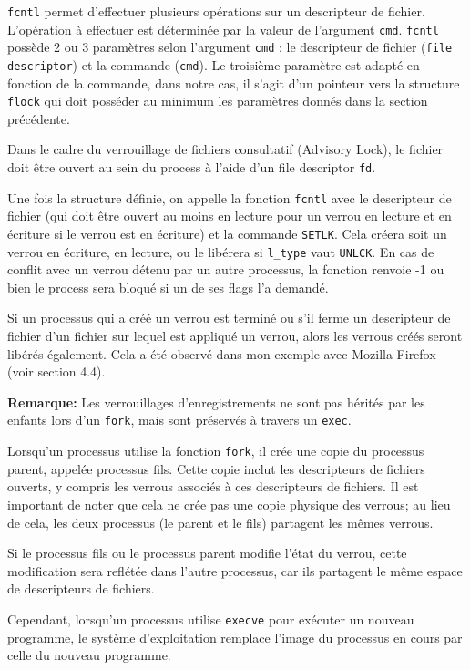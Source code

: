\texttt{fcntl} permet d'effectuer plusieurs opérations sur un descripteur de fichier. L'opération à effectuer est déterminée par la valeur de l'argument \texttt{cmd}. \texttt{fcntl} possède 2 ou 3 paramètres selon l'argument \texttt{cmd} : le descripteur de fichier (\texttt{file descriptor}) et la commande (\texttt{cmd}). Le troisième paramètre est adapté en fonction de la commande, dans notre cas, il s'agit d'un pointeur vers la structure \texttt{flock} qui doit posséder au minimum les paramètres donnés dans la section précédente.
    
Dans le cadre du verrouillage de fichiers consultatif (Advisory Lock), le fichier doit être ouvert au sein du process à l'aide d'un file descriptor \texttt{fd}.

Une fois la structure définie, on appelle la fonction \texttt{fcntl} avec le descripteur de fichier (qui doit être ouvert au moins en lecture pour un verrou en lecture et en écriture si le verrou est en écriture) et la commande \texttt{SETLK}. Cela créera soit un verrou en écriture, en lecture, ou le libérera si \texttt{l\_type} vaut \texttt{UNLCK}. En cas de conflit avec un verrou détenu par un autre processus, la fonction renvoie -1 ou bien le process sera bloqué si un de ses flags l'a demandé.

Si un processus qui a créé un verrou est terminé ou s'il ferme un descripteur de fichier d'un fichier sur lequel est appliqué un verrou, alors les verrous créés seront libérés également. Cela a été observé dans mon exemple avec Mozilla Firefox (voir section 4.4).
\newline

\textbf{Remarque:} 
Les verrouillages d'enregistrements ne sont pas hérités par les enfants lors d'un \texttt{fork}, mais sont préservés à travers un \texttt{exec}.

Lorsqu'un processus utilise la fonction \texttt{fork}, il crée une copie du processus parent, appelée processus fils. Cette copie inclut les descripteurs de fichiers ouverts, y compris les verrous associés à ces descripteurs de fichiers. Il est important de noter que cela ne crée pas une copie physique des verrous; au lieu de cela, les deux processus (le parent et le fils) partagent les mêmes verrous.

Si le processus fils ou le processus parent modifie l'état du verrou, cette modification sera reflétée dans l'autre processus, car ils partagent le même espace de descripteurs de fichiers.

Cependant, lorsqu'un processus utilise \texttt{execve} pour exécuter un nouveau programme, le système d'exploitation remplace l'image du processus en cours par celle du nouveau programme. 

